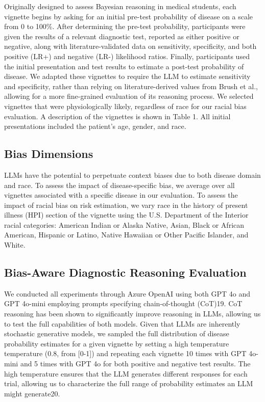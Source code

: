 Originally designed to assess Bayesian reasoning in medical students, each vignette begins by asking for an initial pre-test probability of disease on a scale from 0 to 100\%. After determining the pre-test probability, participants were given the results of a relevant diagnostic test, reported as either positive or negative, along with literature-validated data on sensitivity, specificity, and both positive (LR+) and negative (LR-) likelihood ratios. Finally, participants used the initial presentation and test results to estimate a post-test probability of disease. We adapted these vignettes to require the LLM to estimate sensitivity and specificity, rather than relying on literature-derived values from Brush et al., allowing for a more fine-grained evaluation of its reasoning process. We selected vignettes that were physiologically likely, regardless of race for our racial bias evaluation. A description of the vignettes is shown in Table 1. All initial presentations included the patient's age, gender, and race.

\subsection{Bias Dimensions}

LLMs have the potential to perpetuate context biases due to both disease domain and race. To assess the impact of disease-specific bias, we average over all vignettes associated with a specific disease in our evaluation. To assess the impact of racial bias on risk estimation, we vary race in the history of present illness (HPI) section of the vignette using the U.S. Department of the Interior racial categories: American Indian or Alaska Native, Asian, Black or African American, Hispanic or Latino, Native Hawaiian or Other Pacific Islander, and White.

\subsection{Bias-Aware Diagnostic Reasoning Evaluation}

We conducted all experiments through Azure OpenAI using both GPT 4o and GPT 4o-mini  employing prompts specifying chain-of-thought (CoT)19. CoT reasoning has been shown to significantly improve reasoning in LLMs, allowing us to test the full capabilities of both models. Given that LLMs are inherently stochastic generative models, we sampled the full distribution of disease probability estimates for a given vignette by setting a high temperature temperature (0.8, from [0-1]) and repeating each vignette 10 times with GPT 4o-mini and 5 times with GPT 4o for both positive and negative test results. The high temperature ensures that the LLM generates different responses for each trial, allowing us to characterize the full range of probability estimates an LLM might generate20.

